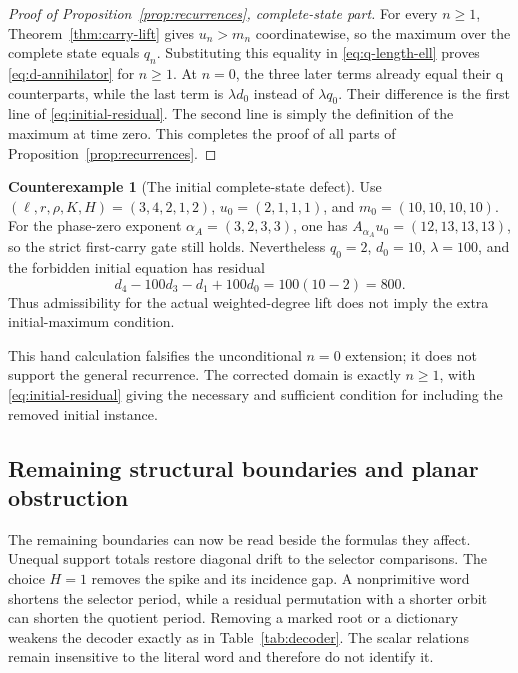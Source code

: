 \documentclass[11pt,letterpaper]{article}
\theoremstyle{definition}
\newtheorem{counterexample}[theorem]{Counterexample}
\theoremstyle{remark}
\numberwithin{equation}{section}
\begin{document}
\begin{proof}[Proof of Proposition~\ref{prop:recurrences}, complete-state part]
For every \(n\geq1\), Theorem~\ref{thm:carry-lift} gives \(u_n>m_n\)
coordinatewise, so the maximum over the complete state equals \(q_n\).
Substituting this equality in \eqref{eq:q-length-ell} proves
\eqref{eq:d-annihilator} for \(n\geq1\).  At \(n=0\), the three later terms
already equal their q counterparts, while the last term is \(\lambda d_0\)
instead of \(\lambda q_0\).  Their difference is the first line of
\eqref{eq:initial-residual}.  The second line is simply the definition of
the maximum at time zero.  This completes the proof of all parts of
Proposition~\ref{prop:recurrences}.
\end{proof}

\begin{counterexample}[The initial complete-state defect]
\label{cex:initial-residual}
Use \((\ell,r,\rho,K,H)=(3,4,2,1,2)\),
\(u_0=(2,1,1,1)\), and \(m_0=(10,10,10,10)\).  For the phase-zero exponent
\(\alpha_A=(3,2,3,3)\), one has
\(A_{\alpha_A}u_0=(12,13,13,13)\), so the strict first-carry gate still
holds.  Nevertheless \(q_0=2\), \(d_0=10\), \(\lambda=100\), and the
forbidden initial equation has residual
\begin{equation}
 d_4-100d_3-d_1+100d_0=100(10-2)=800.
 \label{eq:residual-800}
\end{equation}
Thus admissibility for the actual weighted-degree lift does not imply the
extra initial-maximum condition.
\end{counterexample}

This hand calculation falsifies the unconditional \(n=0\) extension; it
does not support the general recurrence.  The corrected domain is exactly
\(n\geq1\), with \eqref{eq:initial-residual} giving the necessary and
sufficient condition for including the removed initial instance.

\subsection{Remaining structural boundaries and planar obstruction}

The remaining boundaries can now be read beside the formulas they affect.
Unequal support totals restore diagonal drift to the selector comparisons.
The choice \(H=1\) removes the spike and its incidence gap.  A nonprimitive
word shortens the selector period, while a residual permutation with a
shorter orbit can shorten the quotient period.  Removing a marked root or a
dictionary weakens the decoder exactly as in Table~\ref{tab:decoder}.  The
scalar relations remain insensitive to the literal word and therefore do
not identify it.
\end{document}
